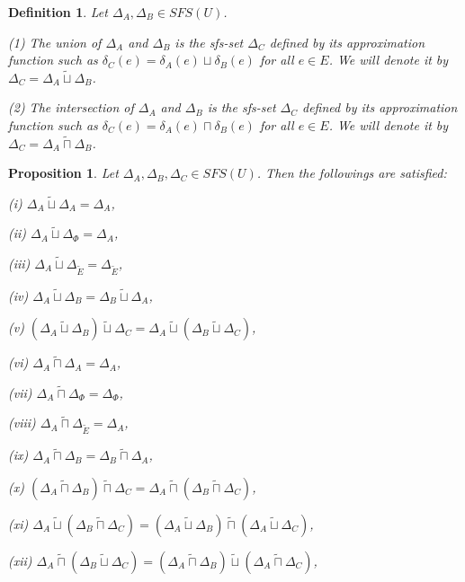 \documentclass{IJFS}
\newtheorem{proposition}[theorem]{Proposition}
\newtheorem{definition}[theorem]{Definition}
\begin{document}
\begin{definition} \label{bk} Let $\Delta_A, \Delta_B\in SFS(U)$.

(1) The union of $\Delta_A$ and  $\Delta_B$ is the sfs-set
$\Delta_C$ defined by its approximation function
such as $\delta_C(e)=\delta_A(e)\sqcup \delta_B(e)$ for all
$e\in E$. We will denote it by $\Delta_C=\Delta_A \widetilde{\sqcup}
\Delta_B$.

(2) The intersection of $\Delta_A$ and  $\Delta_B$ is the sfs-set
$\Delta_C$ defined by its approximation function such as \linebreak[4]
 $\delta_C(e)=\delta_A(e)\sqcap \delta_B(e)$ for all
$e\in E$.  We will denote it by $\Delta_C=\Delta_A \widetilde{\sqcap}
\Delta_B$.
\end{definition}

\begin{proposition} Let $\Delta_A, \Delta_B, \Delta_C \in SFS(U)$. Then
the followings are satisfied:

(i) $\Delta_A \widetilde{\sqcup} \Delta_A=\Delta_A$,

(ii) $\Delta_A \widetilde{\sqcup} \Delta_\Phi=\Delta_A$,

(iii) $\Delta_A \widetilde{\sqcup}
\Delta_{\widetilde{E}}=\Delta_{\widetilde{E}}$,

(iv) $\Delta_A \widetilde{\sqcup} \Delta_B=\Delta_B
\widetilde{\sqcup} \Delta_A$,

(v) $(\Delta_A \widetilde{\sqcup}
\Delta_B)\widetilde{\sqcup}\Delta_C=\Delta_A \widetilde{\sqcup}
(\Delta_B \widetilde{\sqcup} \Delta_C)$,

(vi) $\Delta_A \widetilde{\sqcap} \Delta_A=\Delta_A$,

(vii) $\Delta_A \widetilde{\sqcap} \Delta_\Phi=\Delta_\Phi$,

(viii) $\Delta_A \widetilde{\sqcap}
\Delta_{\widetilde{E}}=\Delta_A$,

(ix) $\Delta_A \widetilde{\sqcap} \Delta_B=\Delta_B
\widetilde{\sqcap} \Delta_A$,

(x) $(\Delta_A \widetilde{\sqcap}
\Delta_B)\widetilde{\sqcap}\Delta_C=\Delta_A \widetilde{\sqcap}
(\Delta_B \widetilde{\sqcap} \Delta_C)$,

(xi) $\Delta_A \widetilde{\sqcup}
(\Delta_B\widetilde{\sqcap}\Delta_C)=(\Delta_A \widetilde{\sqcup}
\Delta_B) \widetilde{\sqcap}
(\Delta_A\widetilde{\sqcup}\Delta_C)$,

(xii) $\Delta_A \widetilde{\sqcap}
(\Delta_B\widetilde{\sqcup}\Delta_C)=(\Delta_A \widetilde{\sqcap}
\Delta_B) \widetilde{\sqcup}
(\Delta_A\widetilde{\sqcap}\Delta_C)$,
\end{proposition}
\end{document}
